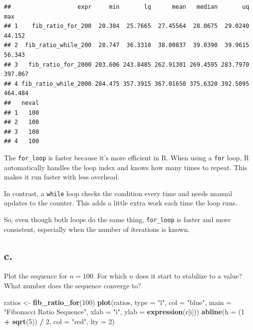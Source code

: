 \documentclass[
]{article}
\newenvironment{Shaded}{\begin{snugshade}}{\end{snugshade}}
\newcommand{\AttributeTok}[1]{\textcolor[rgb]{0.13,0.29,0.53}{#1}}
\newcommand{\DecValTok}[1]{\textcolor[rgb]{0.00,0.00,0.81}{#1}}
\newcommand{\FunctionTok}[1]{\textcolor[rgb]{0.13,0.29,0.53}{\textbf{#1}}}
\newcommand{\NormalTok}[1]{#1}
\newcommand{\OtherTok}[1]{\textcolor[rgb]{0.56,0.35,0.01}{#1}}
\newcommand{\SpecialCharTok}[1]{\textcolor[rgb]{0.81,0.36,0.00}{\textbf{#1}}}
\newcommand{\StringTok}[1]{\textcolor[rgb]{0.31,0.60,0.02}{#1}}
\begin{document}
\begin{verbatim}
##                   expr     min       lq      mean   median       uq     max
## 1    fib_ratio_for_200  20.384  25.7665  27.45564  28.0675  29.0240  44.152
## 2  fib_ratio_while_200  28.747  36.3310  38.00837  39.0390  39.9615  56.343
## 3   fib_ratio_for_2000 203.606 243.8485 262.91301 269.4595 283.7970 397.867
## 4 fib_ratio_while_2000 284.475 357.3915 367.01650 375.6320 392.5095 464.484
##   neval
## 1   100
## 2   100
## 3   100
## 4   100
\end{verbatim}

The \texttt{for\_loop} is faster because it's more efficient in R. When
using a \texttt{for} loop, R automatically handles the loop index and
knows how many times to repeat. This makes it run faster with less
overhead.

In contrast, a \texttt{while} loop checks the condition every time and
needs manual updates to the counter. This adds a little extra work each
time the loop runs.

So, even though both loops do the same thing, \texttt{for\_loop} is
faster and more consistent, especially when the number of iterations is
known.

\subsection{c.}\label{c.}

Plot the sequence for \(n=100\). For which \(n\) does it start to
stabilize to a value? What number does the sequence converge to?

\begin{Shaded}
\begin{Highlighting}[]
\NormalTok{ratios }\OtherTok{\textless{}{-}} \FunctionTok{fib\_ratio\_for}\NormalTok{(}\DecValTok{100}\NormalTok{)}
\FunctionTok{plot}\NormalTok{(ratios, }\AttributeTok{type =} \StringTok{"l"}\NormalTok{, }\AttributeTok{col =} \StringTok{"blue"}\NormalTok{, }\AttributeTok{main =} \StringTok{"Fibonacci Ratio Sequence"}\NormalTok{,}
     \AttributeTok{xlab =} \StringTok{"i"}\NormalTok{, }\AttributeTok{ylab =} \FunctionTok{expression}\NormalTok{(r[i]))}
\FunctionTok{abline}\NormalTok{(}\AttributeTok{h =}\NormalTok{ (}\DecValTok{1} \SpecialCharTok{+} \FunctionTok{sqrt}\NormalTok{(}\DecValTok{5}\NormalTok{)) }\SpecialCharTok{/} \DecValTok{2}\NormalTok{, }\AttributeTok{col =} \StringTok{"red"}\NormalTok{, }\AttributeTok{lty =} \DecValTok{2}\NormalTok{)}
\end{Highlighting}
\end{Shaded}
\end{document}
